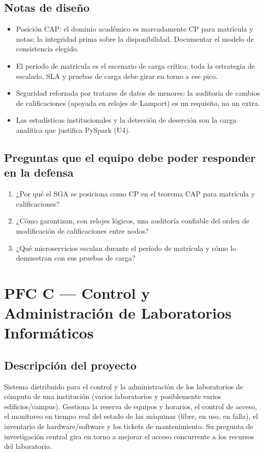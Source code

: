 \documentclass[11pt]{article}
\begin{document}
\subsection{Notas de diseño}
\begin{itemize}[leftmargin=1.2em,itemsep=2pt]
\item Posición CAP: el dominio académico es marcadamente CP para matrícula y notas; la integridad prima sobre la disponibilidad. Documentar el modelo de consistencia elegido.
\item El período de matrícula es el escenario de carga crítica; toda la estrategia de escalado, SLA y pruebas de carga debe girar en torno a ese pico.
\item Seguridad reforzada por tratarse de datos de menores: la auditoría de cambios de calificaciones (apoyada en relojes de Lamport) es un requisito, no un extra.
\item Las estadísticas institucionales y la detección de deserción son la carga analítica que justifica PySpark (U4).
\end{itemize}
\subsection{Preguntas que el equipo debe poder responder en la defensa}
\begin{enumerate}[leftmargin=1.4em,itemsep=2pt]
\item ¿Por qué el SGA se posiciona como CP en el teorema CAP para matrícula y calificaciones?
\item ¿Cómo garantizan, con relojes lógicos, una auditoría confiable del orden de modificación de calificaciones entre nodos?
\item ¿Qué microservicios escalan durante el período de matrícula y cómo lo demuestran con sus pruebas de carga?
\end{enumerate}
\clearpage
\section{PFC C --- Control y Administración de Laboratorios Informáticos}
\subsection{Descripción del proyecto}
Sistema distribuido para el control y la administración de los laboratorios de cómputo de una institución (varios laboratorios y posiblemente varios edificios/campus). Gestiona la reserva de equipos y horarios, el control de acceso, el monitoreo en tiempo real del estado de las máquinas (libre, en uso, en falla), el inventario de hardware/software y los tickets de mantenimiento. Su pregunta de investigación central gira en torno a mejorar el acceso concurrente a los recursos del laboratorio.
\end{document}
